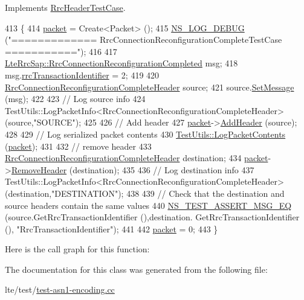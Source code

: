 Implements \hyperlink{classRrcHeaderTestCase_ab72ac5cd07c4359237c8e36ab16f5414}{Rrc\+Header\+Test\+Case}.


\begin{DoxyCode}
413 \{
414   \hyperlink{classRrcHeaderTestCase_a6f0748c0e845f797497fbda1ca781803}{packet} = Create<Packet> ();
415   \hyperlink{group__logging_ga413f1886406d49f59a6a0a89b77b4d0a}{NS\_LOG\_DEBUG} (\textcolor{stringliteral}{"============= RrcConnectionReconfigurationCompleteTestCase ==========="});
416 
417   \hyperlink{structns3_1_1LteRrcSap_1_1RrcConnectionReconfigurationCompleted}{LteRrcSap::RrcConnectionReconfigurationCompleted} msg;
418   msg.\hyperlink{structns3_1_1LteRrcSap_1_1RrcConnectionReconfigurationCompleted_ae3ed8902fd06c26f99b18dc481fa65d9}{rrcTransactionIdentifier} = 2;
419 
420   \hyperlink{classns3_1_1RrcConnectionReconfigurationCompleteHeader}{RrcConnectionReconfigurationCompleteHeader} source;
421   source.\hyperlink{classns3_1_1RrcConnectionReconfigurationCompleteHeader_addcb9537ee64f4f528ce817069836ba8}{SetMessage} (msg);
422 
423   \textcolor{comment}{// Log source info}
424   TestUtils::LogPacketInfo<RrcConnectionReconfigurationCompleteHeader> (source,\textcolor{stringliteral}{"SOURCE"});
425 
426   \textcolor{comment}{// Add header}
427   \hyperlink{classRrcHeaderTestCase_a6f0748c0e845f797497fbda1ca781803}{packet}->\hyperlink{classns3_1_1Packet_a465108c595a0bc592095cbcab1832ed8}{AddHeader} (source);
428 
429   \textcolor{comment}{// Log serialized packet contents}
430   \hyperlink{classTestUtils_a9391dac3282094e6e57c0052d88a086f}{TestUtils::LogPacketContents} (\hyperlink{classRrcHeaderTestCase_a6f0748c0e845f797497fbda1ca781803}{packet});
431 
432   \textcolor{comment}{// remove header}
433   \hyperlink{classns3_1_1RrcConnectionReconfigurationCompleteHeader}{RrcConnectionReconfigurationCompleteHeader} destination;
434   \hyperlink{classRrcHeaderTestCase_a6f0748c0e845f797497fbda1ca781803}{packet}->\hyperlink{classns3_1_1Packet_a0961eccf975d75f902d40956c93ba63e}{RemoveHeader} (destination);
435 
436   \textcolor{comment}{// Log destination info}
437   TestUtils::LogPacketInfo<RrcConnectionReconfigurationCompleteHeader> (destination,\textcolor{stringliteral}{"DESTINATION"});
438 
439   \textcolor{comment}{// Check that the destination and source headers contain the same values}
440   \hyperlink{group__testing_ga2a9d78cffb3db8e867c35fff0b698cf5}{NS\_TEST\_ASSERT\_MSG\_EQ} (source.GetRrcTransactionIdentifier (),destination.
      GetRrcTransactionIdentifier (), \textcolor{stringliteral}{"RrcTransactionIdentifier"});
441 
442   \hyperlink{classRrcHeaderTestCase_a6f0748c0e845f797497fbda1ca781803}{packet} = 0;
443 \}
\end{DoxyCode}


Here is the call graph for this function\+:




The documentation for this class was generated from the following file\+:\begin{DoxyCompactItemize}
\item 
lte/test/\hyperlink{test-asn1-encoding_8cc}{test-\/asn1-\/encoding.\+cc}\end{DoxyCompactItemize}
